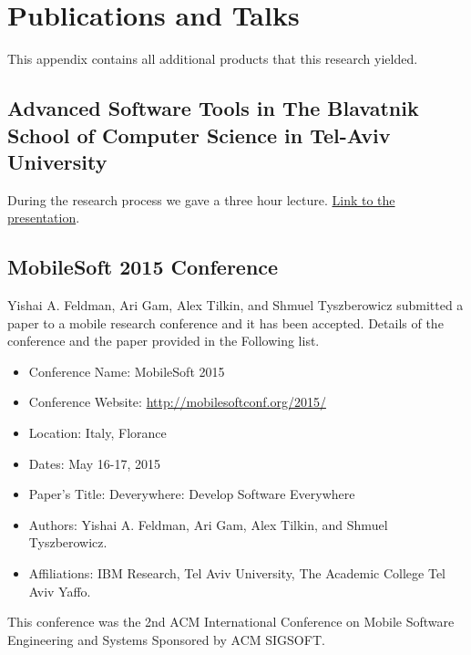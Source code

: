 \chapter{Publications and Talks}
This appendix contains all additional products that this research yielded.

\section{Advanced Software Tools in The Blavatnik School of Computer Science in Tel-Aviv University}
During the research process we gave a three hour lecture. \href{https://www.icloud.com/keynote/AwBWCAESEMmhJ9LSgI9wRLhfRTk81c4aKj7lviy1R3R9Yf61KLkOjxnc8qt5FRwhMAmuF5qYNCPOZK9QGyrifKcccAMCUCAQEEIDx6Kr_gzGatd8ip7oAT1CRKjYgJolac-V7YeH3kQRO3#Deverywhere-TAU}{Link to the presentation}.
\section{MobileSoft 2015 Conference}
Yishai A. Feldman, Ari Gam, Alex Tilkin, and Shmuel Tyszberowicz submitted a paper to a mobile research conference and it has been accepted. Details of the conference and the paper provided in the Following list.
\begin{itemize}
	\item Conference Name: MobileSoft 2015
	\item Conference Website: \url{http://mobilesoftconf.org/2015/}
	\item Location: Italy, Florance
	\item Dates: May 16-17, 2015
	\item Paper's Title: Deverywhere: Develop Software Everywhere
	\item Authors: Yishai A. Feldman, Ari Gam, Alex Tilkin, and Shmuel Tyszberowicz.
	\item Affiliations: IBM Research, Tel Aviv University, The Academic College Tel Aviv Yaffo.
\end{itemize}
This conference was the 2nd ACM International Conference on Mobile Software Engineering and Systems Sponsored by ACM SIGSOFT.
